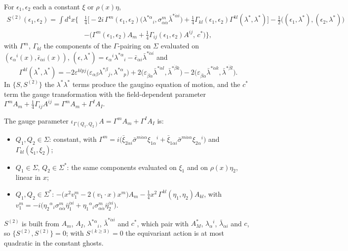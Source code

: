 \begin{remark}
For $\epsilon_1,\epsilon_2$ each a constant $\xi$ or $\rho(x)\eta$,
\[
\begin{aligned}
S^{(2)}(\epsilon_1,\epsilon_2)=\int d^4x\Big\{&\tfrac14\Big[-2i\,\Gamma^m(\epsilon_1,\epsilon_2)\big(\lambda^{*\alpha}{}_i,\sigma^m_{\alpha\dot\alpha}\bar\lambda^{*\dot\alpha i}\big)+\tfrac14\Gamma_{kl}(\epsilon_1,\epsilon_2)\Gamma^{kl}(\lambda^*,\lambda^*)\Big]-\tfrac12\big((\epsilon_1,\lambda^*),(\epsilon_2,\lambda^*)\big)\\
&-\big(\Gamma^m(\epsilon_1,\epsilon_2)A_m+\tfrac14\Gamma_{ij}(\epsilon_1,\epsilon_2)A^{ij},\,c^*\big)\Big\},
\end{aligned}
\]
with $\Gamma^m$, $\Gamma_{kl}$ the components of the $\Gamma$-pairing on $\Sigma$ evaluated on $(\epsilon_\alpha{}^i(x),\bar\epsilon_{\dot\alpha i}(x))$, $(\epsilon,\lambda^*)=\epsilon_\alpha{}^i\lambda^{*\alpha}{}_i-\bar\epsilon_{\dot\alpha i}\bar\lambda^{*\dot\alpha i}$ and
\[
\Gamma^{kl}(\lambda^*,\lambda^*)=-2\varepsilon^{klpj}\big(\varepsilon_{\alpha\beta}\lambda^{*\beta}{}_j,\lambda^{*\alpha}{}_p\big)+2\big(\varepsilon_{\dot\beta\dot\alpha}\bar\lambda^{*\dot\alpha l},\bar\lambda^{*\dot\beta k}\big)-2\big(\varepsilon_{\dot\beta\dot\alpha}\bar\lambda^{*\dot\alpha k},\bar\lambda^{*\dot\beta l}\big).
\]
In $\{S,S^{(2)}\}$ the $\lambda^*\lambda^*$ terms produce the gaugino equation of motion, and the $c^*$ term the gauge transformation with the field-dependent parameter $\Gamma^mA_m+\tfrac14\Gamma_{ij}A^{ij}=\Gamma^mA_m+\Gamma^IA_I$.
\end{remark}

\begin{remark}
The gauge parameter $\iota_{\Gamma(Q_1,Q_2)}A=\Gamma^mA_m+\Gamma^IA_I$ is:
\begin{itemize}
\item $Q_1,Q_2\in\Sigma$: constant, with $\Gamma^m=i\big(\bar\xi_{2\dot\alpha i}\bar\sigma^{m\dot\alpha\alpha}\xi_{1\alpha}{}^i+\bar\xi_{1\dot\alpha i}\bar\sigma^{m\dot\alpha\alpha}\xi_{2\alpha}{}^i\big)$ and $\Gamma_{kl}(\xi_1,\xi_2)$;
\item $Q_1\in\Sigma$, $Q_2\in\Sigma^*$: the same components evaluated on $\xi_1$ and on $\rho(x)\eta_2$, linear in $x$;
\item $Q_1,Q_2\in\Sigma^*$: $-\big(x^2v_1^m-2(v_1\cdot x)x^m\big)A_m-\tfrac14x^2\,\Gamma^{kl}(\eta_1,\eta_2)A_{kl}$, with $v_1^m=-i\big(\eta_2{}^\alpha{}_i\sigma^m_{\alpha\dot\alpha}\bar\eta_1^{\dot\alpha i}+\eta_1{}^\alpha{}_i\sigma^m_{\alpha\dot\alpha}\bar\eta_2^{\dot\alpha i}\big)$.
\end{itemize}
$S^{(2)}$ is built from $A_m$, $A_I$, $\lambda^{*\alpha}{}_i$, $\bar\lambda^{*\dot\alpha i}$ and $c^*$, which pair with $A^*_M$, $\lambda_\alpha{}^i$, $\bar\lambda_{\dot\alpha i}$ and $c$, so $\{S^{(2)},S^{(2)}\}=0$; with $S^{(k\ge3)}=0$ the equivariant action is at most quadratic in the constant ghosts.
\end{remark}

